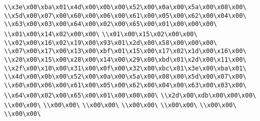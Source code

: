 \verb|\\x3e\x00\xba\x01\x4d\x00\x0b\x00\x52\x00\x0a\x00\x5a\x00\x08\x00\|\newline
\verb|\\x5d\x00\x07\x00\x60\x00\x06\x00\x61\x00\x05\x00\x62\x00\x04\x00\|\newline
\verb|\\x63\x00\x03\x00\x64\x00\x02\x00\x65\x00\x01\x00\x00\x00\|\newline
\verb|\\x01\x00\x14\x02\x00\x00\|\newline
\verb|\\x01\x00\x15\x02\x00\x00\|\newline
\verb|\\x02\x00\x16\x02\x19\x00\x93\x01\x2d\x00\x58\x00\x00\x00\|\newline
\verb|\\x07\x00\x17\x00\x13\x00\xbf\x01\x15\x00\x17\x02\x1d\x00\x16\x00\|\newline
\verb|\\x20\x00\x15\x00\x28\x00\x14\x00\x29\x00\xbd\x01\x2d\x00\x11\x00\|\newline
\verb|\\x2f\x00\x10\x00\x31\x00\x0f\x00\x32\x00\xbc\x01\x3e\x00\xba\x01\|\newline
\verb|\\x4d\x00\x0b\x00\x52\x00\x0a\x00\x5a\x00\x08\x00\x5d\x00\x07\x00\|\newline
\verb|\\x60\x00\x06\x00\x61\x00\x05\x00\x62\x00\x04\x00\x63\x00\x03\x00\|\newline
\verb|\\x64\x00\x02\x00\x65\x00\x01\x00\x00\x00\|\newline
\verb|\\x2d\x00\xdb\x00\x00\x00\|\newline
\verb|\\x00\x00\|\newline
\verb|\\x00\x00\|\newline
\verb|\\x00\x00\|\newline
\verb|\\x00\x00\|\newline
\verb|\\x00\x00\|\newline
\verb|\\x00\x00\|\newline
\verb|\\x00\x00\|\newline
